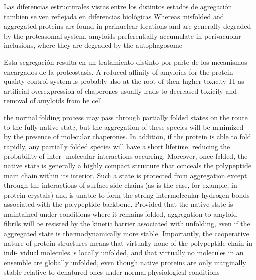 Las diferencias estructurales vistas entre los distintos estados de agregación tambien se ven reflejada en diferencias biológicas 
Whereas misfolded and aggregated proteins are found in perinuclear locations and are generally degraded by the 
proteasomal system, amyloids preferentially accumulate in perivacuolar inclusions, where they are degraded by the autophagosome.

Esta segregación resulta en un tratamiento distinto por parte de los mecanismos encargados de la proteostasis.
A reduced affinity of amyloids for the protein quality control system is probably also at the root of their higher toxicity 11 as artificial overexpression of chaperones
usually leads to decreased toxicity and removal of amyloids from he cell.






the normal folding process may pass through
partially folded states on the route to the fully native state,
but the aggregation of these species will be minimized by
the presence of molecular chaperones. In addition, if the
protein is able to fold rapidly, any partially folded species
will have a short lifetime, reducing the probability of inter-
molecular interactions occurring. Moreover, once folded,
the native state is generally a highly compact structure
that conceals the polypeptide main chain within its
interior. Such a state is protected from aggregation except
through the interactions of surface side chains (as is the
case, for example, in protein crystals) and is unable to
form the strong intermolecular hydrogen bonds associated
with the polypeptide backbone. Provided that the native
state is maintained under conditions where it remains
folded, aggregation to amyloid fibrils will be resisted by
the kinetic barrier associated with unfolding, even if the
aggregated state is thermodynamically more stable.
Importantly, the cooperative nature of protein structures
means that virtually none of the polypeptide chain in indi-
vidual molecules is locally unfolded, and that virtually no
molecules in an ensemble are globally unfolded, even
though native proteins are only marginally stable relative
to denatured ones under normal physiological conditions



